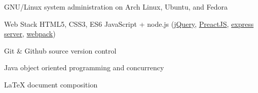 

\begin{cvskills}

  \cvskill
    {GNU/Linux} %
    {system administration on Arch Linux, Ubuntu, and Fedora} %

  \cvskill
    {Web Stack} %
    {HTML5, CSS3, ES6 JavaScript + node.js (\href{https://jquery.com/}{jQuery}, 
    \href{https://preactjs.com/}{PreactJS},
    \href{https://expressjs.com/}{express server},
    \href{https://webpack.js.org/}{webpack})
} %

  \cvskill
    {Git \& Github} %
    {source version control} %

  \cvskill
    {Java} %
    {object oriented programming and concurrency} %

  \cvskill
    {LaTeX} %
    {document composition} %

\end{cvskills}
